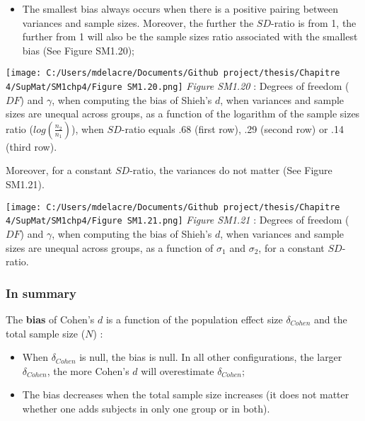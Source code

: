\documentclass[
  english,
  man,mask,floatsintext]{apa6}
\providecommand{\tightlist}{%
  \setlength{\itemsep}{0pt}\setlength{\parskip}{0pt}}
\begin{document}
\newpage

\begin{itemize}
\tightlist
\item
  The smallest bias always occurs when there is a positive pairing between variances and sample sizes. Moreover, the further the \(SD\)-ratio is from 1, the further from 1 will also be the sample sizes ratio associated with the smallest bias (See Figure SM1.20);
\end{itemize}

\texttt{[image: C:/Users/mdelacre/Documents/Github project/thesis/Chapitre 4/SupMat/SM1chp4/Figure SM1.20.png]}
\emph{Figure SM1.20} : Degrees of freedom (\(DF\)) and \(\gamma\), when computing the bias of Shieh's \(d\), when variances and sample sizes are unequal across groups, as a function of the logarithm of the sample sizes ratio (\(log \left( \frac{n_2}{n_1} \right)\)), when \(SD\)-ratio equals .68 (first row), .29 (second row) or .14 (third row).

\newpage

Moreover, for a constant \(SD\)-ratio, the variances do not matter (See Figure SM1.21).

\texttt{[image: C:/Users/mdelacre/Documents/Github project/thesis/Chapitre 4/SupMat/SM1chp4/Figure SM1.21.png]}
\emph{Figure SM1.21} : Degrees of freedom (\(DF\)) and \(\gamma\), when computing the bias of Shieh's \(d\), when variances and sample sizes are unequal across groups, as a function of \(\sigma_1\) and \(\sigma_2\), for a constant \(SD\)-ratio.

\hypertarget{in-summary}{%
\subsubsection{In summary}\label{in-summary}}

The \textbf{bias} of Cohen's \(d\) is a function of the population effect size \(\delta_{Cohen}\) and the total sample size (\(N\)) :

\begin{itemize}
\tightlist
\item
  When \(\delta_{Cohen}\) is null, the bias is null. In all other configurations, the larger \(\delta_{Cohen}\), the more Cohen's \(d\) will overestimate \(\delta_{Cohen}\);\\
\item
  The bias decreases when the total sample size increases (it does not matter whether one adds subjects in only one group or in both).
\end{itemize}
\end{document}

